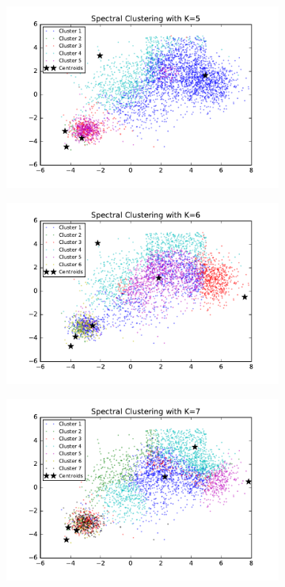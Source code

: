 \begin{figure}[htb]
\begin{subfigure}[b]{0.475\textwidth}
            \includegraphics[width=\textwidth]{./figures/bigClustering_spectral_5.pdf}
        \end{subfigure}
        \hfill
        \begin{subfigure}[b]{0.475\textwidth}   
            \centering 
            \includegraphics[width=\textwidth]{./figures/bigClustering_spectral_6.pdf}
        \end{subfigure}
        \begin{subfigure}[b]{0.475\textwidth}   
            \centering 
            \includegraphics[width=\textwidth]{./figures/bigClustering_spectral_7.pdf}

\end{subfigure}
\end{figure}
